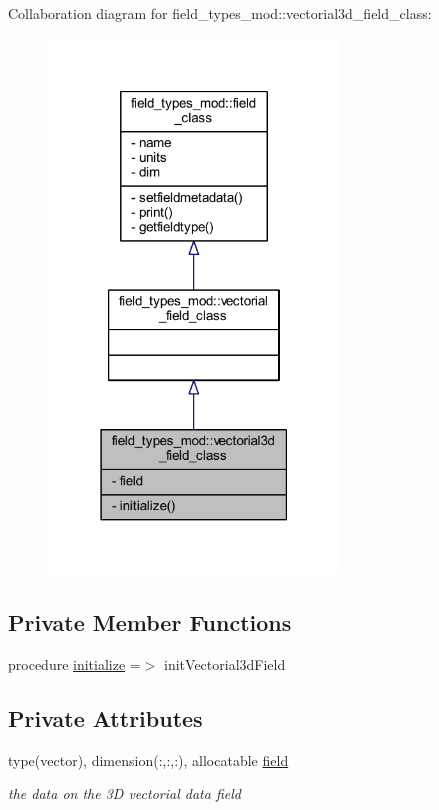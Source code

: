 Collaboration diagram for field\+\_\+types\+\_\+mod\+:\+:vectorial3d\+\_\+field\+\_\+class\+:
\nopagebreak
\begin{figure}[H]
\begin{center}
\leavevmode
\includegraphics[width=219pt]{structfield__types__mod_1_1vectorial3d__field__class__coll__graph}
\end{center}
\end{figure}
\subsection*{Private Member Functions}
\begin{DoxyCompactItemize}
\item 
procedure \mbox{\hyperlink{structfield__types__mod_1_1vectorial3d__field__class_a219c7d1c8e49593aa1616ed50253a6cc}{initialize}} =$>$ init\+Vectorial3d\+Field
\end{DoxyCompactItemize}
\subsection*{Private Attributes}
\begin{DoxyCompactItemize}
\item 
type(vector), dimension(\+:,\+:,\+:), allocatable \mbox{\hyperlink{structfield__types__mod_1_1vectorial3d__field__class_a9edbb4fe466c94b401cad9cff1a910de}{field}}
\begin{DoxyCompactList}\small\item\em the data on the 3D vectorial data field \end{DoxyCompactList}\end{DoxyCompactItemize}



